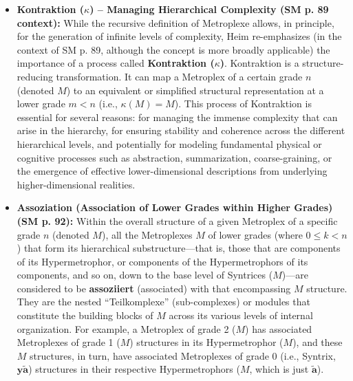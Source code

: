 \documentclass[12pt]{article}
\newcommand{\q}[1]{\enquote{#1}}
\newcommand{\syntrix}{\bm{y\widetilde{a}}}
\newcommand{\metrophor}{\bm{\widetilde{a}}}
\def\metroplex#1#2{M}%
\newcommand{\hypersyntrix}{\metroplex{1}{F}}
\newcommand{\hypermetrophor}[1]{%
  \metroplex{#1}{a}%
}
\begin{document}
\begin{itemize}
    \item \textbf{Kontraktion (\( \kappa \)) – Managing Hierarchical Complexity (SM p. 89 context):}
    While the recursive definition of Metroplexe allows, in principle, for the generation of infinite levels of complexity, Heim re-emphasizes (in the context of SM p. 89, although the concept is more broadly applicable) the importance of a process called \textbf{Kontraktion (\( \kappa \))}. Kontraktion is a structure-reducing transformation. It can map a Metroplex of a certain grade \( n \) (denoted \( \metroplex{n}{} \)) to an equivalent or simplified structural representation at a lower grade \( m < n \) (i.e., \( \kappa(\metroplex{n}{}) = \metroplex{m}' \)). This process of Kontraktion is essential for several reasons: for managing the immense complexity that can arise in the hierarchy, for ensuring stability and coherence across the different hierarchical levels, and potentially for modeling fundamental physical or cognitive processes such as abstraction, summarization, coarse-graining, or the emergence of effective lower-dimensional descriptions from underlying higher-dimensional realities.

    \item \textbf{Assoziation (Association of Lower Grades within Higher Grades) (SM p. 92):}
    Within the overall structure of a given Metroplex of a specific grade \( n \) (denoted \( \metroplex{n}{} \)), all the Metroplexes \( \metroplex{k}{} \) of lower grades (where \( 0 \leq k < n \)) that form its hierarchical substructure—that is, those that are components of its Hypermetrophor, or components of the Hypermetrophors of its components, and so on, down to the base level of Syntrices (\(\metroplex{0}{}\))—are considered to be \textbf{assoziiert} (associated) with that encompassing \( \metroplex{n}{} \) structure. They are the nested \q{Teilkomplexe} (sub-complexes) or modules that constitute the building blocks of \( \metroplex{n}{} \) across its various levels of internal organization. For example, a Metroplex of grade 2 (\( \metroplex{2}{} \)) has associated Metroplexes of grade 1 (\( \hypersyntrix \)) structures in its Hypermetrophor (\( \hypermetrophor{1}{} \)), and these \( \hypersyntrix \) structures, in turn, have associated Metroplexes of grade 0 (i.e., Syntrix, \( \syntrix \)) structures in their respective Hypermetrophors (\( \hypermetrophor{0}{} \), which is just \( \metrophor \)).


\end{itemize}
\end{document}
